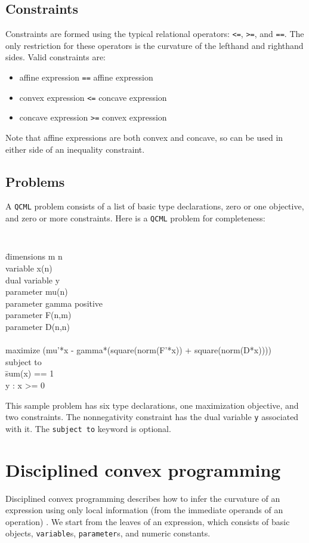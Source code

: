 \documentclass[11pt]{article}
\def\qcml{\texttt{QCML}\xspace}
\begin{document}
\subsection{Constraints}
Constraints are formed using the typical relational operators: {\tt <=},
{\tt >=}, and {\tt ==}. The only restriction for these operators is the
curvature of the lefthand and righthand sides. Valid constraints are:
\begin{itemize}
\item affine expression {\tt ==} affine expression
\item convex expression {\tt <=} concave expression
\item concave expression {\tt >=} convex expression
\end{itemize}

Note that affine expressions are both convex and concave, so can be used
in either side of an inequality constraint.

\subsection{Problems}
A \qcml problem consists of a list of basic type declarations, zero or one
objective, and zero or more constraints. Here is a \qcml problem for
completeness:
{\tt
\begin{tabbing}
\qquad
\= dimensions m n \\
\> variable x(n) \\
\> dual variable y \\
\> parameter mu(n)\\
\> parameter gamma positive\\
\> parameter F(n,m) \\
\> parameter D(n,n) \\
\\
\> maximize (mu'*x - gamma*(square(norm(F'*x)) + square(norm(D*x)))) \\
\> subject to \\
\> \qquad \= sum(x) == 1 \\
\> \> y : x >= 0
\end{tabbing}
}
This sample problem has six type declarations, one maximization objective, and
two constraints. The nonnegativity constraint has the dual variable {\tt y}
associated with it. The {\tt subject to} keyword is optional.

\section{Disciplined convex programming}
\label{s-ug-dcp}
Disciplined convex programming describes how to infer the curvature of an
expression using only local information (from the immediate operands of an
operation) \cite{CVX}. We start from the leaves of an expression, which consists
of basic objects, {\tt variable}s, {\tt parameter}s, and numeric constants.
\end{document}

